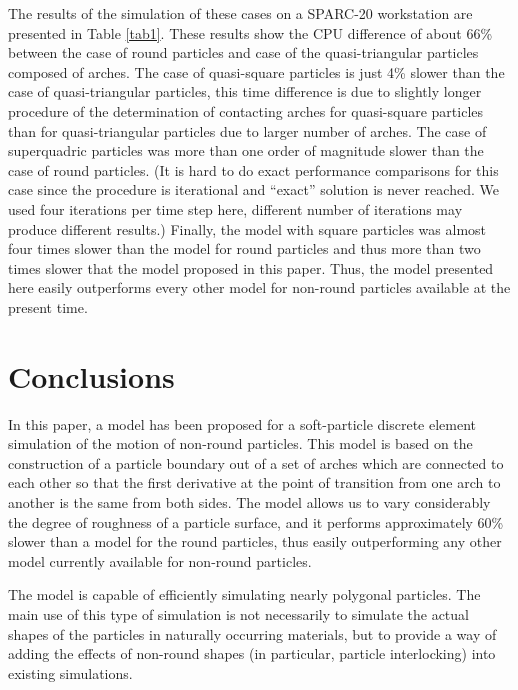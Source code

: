 \documentclass[granma]{svjour}
\begin{document}
The results of the simulation of these cases on a SPARC-20 workstation are
presented in Table \ref{tab1}. These results show the CPU difference of
about
66\%
between the case of round particles and case of the quasi-triangular
particles composed of arches. The case of quasi-square particles is just 4\%
slower than the case of quasi-triangular particles, this time difference is
due to slightly longer procedure of the determination of contacting arches
for quasi-square particles than for quasi-triangular particles due to larger
number of arches. The case of superquadric particles was more than one
order of magnitude slower than the case of round particles. (It is hard to do
exact performance comparisons for this case since the procedure is
iterational and ``exact'' solution is never reached. We used four iterations
per time step here, different number of iterations may produce different
results.) Finally, the model with square particles was almost four times
slower than the model for round particles and thus more than two times slower
that the model proposed in this paper. Thus, the model presented here easily
outperforms every other model for non-round particles available at the
present time.


\section{Conclusions}

In this paper, a model has been proposed for a soft-particle discrete element
simulation of the motion of non-round particles. This model is based on the
construction of a particle boundary out of a set of arches which are
connected to each other so that the first derivative at the point of
transition from one arch to another is the same from both sides. The model
allows us to vary considerably the degree of roughness of a particle surface,
and it performs approximately 60\% slower than a model for the round
particles, thus easily outperforming any other model currently available for
non-round particles.

The model is capable of efficiently simulating nearly polygonal particles.
The main use of this type of simulation is not necessarily to simulate the
actual shapes of the particles in naturally occurring materials, but to
provide a way of adding the effects of non-round shapes (in particular,
particle interlocking) into existing simulations.
\end{document}
